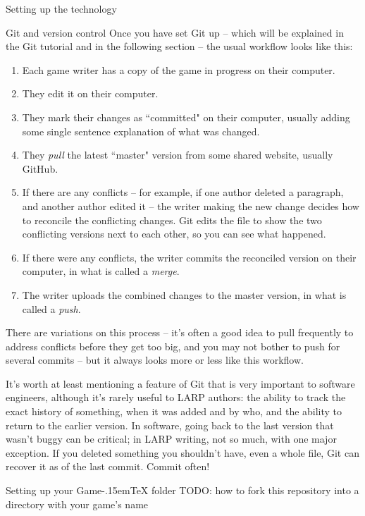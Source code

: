 \documentclass[11pt]{article}
\def\gametex{\mbox{Game\kern-.15em\TeX}}
\begin{document}
\begin{section}{Setting up the technology}
\begin{subsection}{Git and version control}
Once you have set Git up -- which will be explained in the Git tutorial and in the following section -- the usual workflow looks like this:
\begin{enumerate}
\item Each game writer has a copy of the game in progress on their computer.
\item They edit it on their computer.
\item They mark their changes as ``committed" on their computer, usually adding some single sentence explanation of what was changed.
\item They \textit{pull} the latest ``master" version from some shared website, usually GitHub.  
\item If there are any conflicts – for example, if one author deleted a paragraph, and another author edited it – the writer making the new change decides how to reconcile the conflicting changes.  Git edits the file to show the two conflicting versions next to each other, so you can see what happened.
\item If there were any conflicts, the writer commits the reconciled version on their computer, in what is called a \textit{merge}.
\item The writer uploads the combined changes to the master version, in what is called a \textit{push}.
\end{enumerate}

There are variations on this process -- it's often a good idea to pull frequently to address conflicts before they get too big, and you may not bother to push for several commits -- but it always looks more or less like this workflow.

It's worth at least mentioning a feature of Git that is very important to software engineers, although it's rarely useful to LARP authors: the ability to track the exact history of something, when it was added and by who, and the ability to return to the earlier version.  In software, going back to the last version that wasn't buggy can be critical; in LARP writing, not so much, with one major exception.  If you deleted something you shouldn't have, even a whole file, Git can recover it as of the last commit.  Commit often!
\end{subsection}
\begin{subsection}{Setting up your \gametex{} folder}
TODO: how to fork this repository into a directory with your game's name
\end{subsection}
\end{section}
\end{document}
